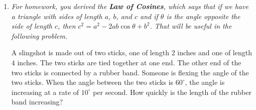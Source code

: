 \documentclass[main]{subfiles}
\begin{document}
\begin{enumerate}
\begin{solution}
\begin{align*}
      \sin^2 \theta &= \cos^2 \theta \\
      \frac{\sin^2 \theta}{\cos^2 \theta} &= 1 \\
      \tan \theta &= \pm 1
    \end{align*}
    The only solution of $\tan \theta = \pm 1$ in $\left[ 0, \frac{\pi}{2}
    \right]$ is $\theta = \frac{\pi}{4}$.  So, the critical points of
    $A(\theta)$ on $\left[ 0, \frac{\pi}{2} \right]$ are $0,
    \frac{\pi}{4}, \frac{\pi}{2}$.  (Remember that endpoints of a closed
    interval are always considered critical points.)  Since we're working
    on a closed interval, an easy way to find the absolute maximum is just
    to evaluate our function at all of the critical points and see which
    gives the highest value:
    \begin{align*}
      A(0) &= 8 \sin 0 \cos 0 = 0 \\
      A \left( \frac{\pi}{4} \right) &= 8 \sin \frac{\pi}{4} \cos
      \frac{\pi}{4} = 4 \\
      A \left( \frac{\pi}{2} \right) &= 8 \sin \frac{\pi}{2} \cos
      \frac{\pi}{2} = 0
    \end{align*}
    So, the maximum area is $\boxed{4}$.

    \emph{Note:} If you said the domain was $\left(0, \frac{\pi}{2}
    \right)$, then you'd have just one critical point, $\theta =
    \frac{\pi}{4}$, and you could use the First Derivative Test or Second
    Derivative Test to see that this is the absolute maximum.
  \end{solution}

\item  %

  \emph{For homework, you derived the \textbf{Law of
      Cosines}, which says that if we have a triangle with sides of length
    $a$, $b$, and $c$ and if $\theta$ is the angle opposite the side of
    length $c$, then $c^2 = a^2 - 2ab \cos \theta + b^2$.  That will be
    useful in the following problem.}

  \begin{problem}[\newpage]
    A slingshot is made out of two sticks, one of length $2$ inches and
    one of length $4$ inches.  The two sticks are tied together at one
    end.  The other end of the two sticks is connected by a rubber band.
    Someone is flexing the angle of the two sticks.  When the angle
    between the two sticks is $60^{\circ}$, the angle is increasing at a
    rate of $10^\circ$ per second.  How quickly is the length of the
    rubber band increasing?
  \end{problem}


\end{enumerate}
\end{document}
